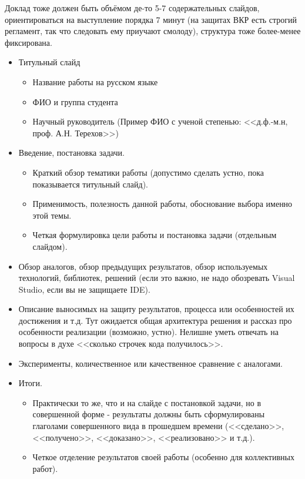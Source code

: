 \documentclass[a5paper]{article}
\begin{document}
Доклад тоже должен быть объёмом де-то 5-7 содержательных слайдов, ориентироваться на выступление порядка 7 минут (на защитах ВКР есть строгий регламент, так что следовать ему приучают смолоду), структура тоже более-менее фиксирована.
\begin{itemize}
	\item Титульный слайд
	\begin{itemize}
		\item Название работы на русском языке
		\item ФИО и группа студента
		\item Научный руководитель (Пример ФИО с ученой степенью: <<д.ф.-м.н, проф. А.Н. Терехов>>)
	\end{itemize}
	\item Введение, постановка задачи.
	\begin{itemize}
		\item Краткий обзор тематики работы (допустимо сделать устно, пока показывается титульный слайд).
		\item Применимость, полезность данной работы, обоснование выбора именно этой темы.
		\item Четкая формулировка цели работы и постановка задачи (отдельным слайдом).
	\end{itemize}
	\item Обзор аналогов, обзор предыдущих результатов, обзор используемых технологий, библиотек, решений (если это важно, не надо обозревать Visual Studio, если вы не защищаете IDE).
	\item Описание выносимых на защиту результатов, процесса или особенностей их достижения и т.д. Тут ожидается общая архитектура решения и рассказ про особенности реализации (возможно, устно). Нелишне уметь отвечать на вопросы в духе <<сколько строчек кода получилось>>.
	\item Эксперименты, количественное или качественное сравнение с аналогами.
	\item Итоги.
	\begin{itemize}
		\item Практически то же, что и на слайде с постановкой задачи, но в совершенной форме - результаты должны быть сформулированы глаголами совершенного вида в прошедшем времени (<<сделано>>, <<получено>>, <<доказано>>, <<реализовано>> и т.д.).
		\item Четкое отделение результатов своей работы (особенно для коллективных работ).
	\end{itemize}
\end{itemize}
\end{document}
